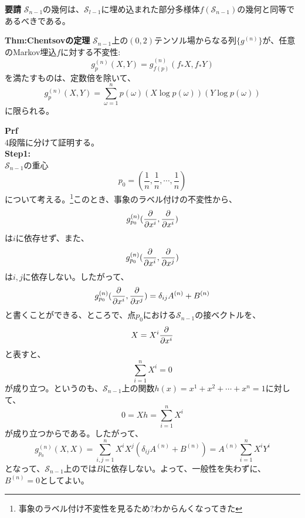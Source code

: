 \documentclass[a4paper,11pt]{jsarticle}
\numberwithin{equation}{section}
\begin{document}

\begin{itembox}[l]{\textbf{要請}}
    $\mathcal{S}_{n-1}$の幾何は、$\mathcal{S}_{l-1}$に埋め込まれた部分多様体$f(\mathcal{S}_{n-1})$の幾何と同等であるべきである。
\end{itembox}

\begin{itembox}[l]{\textbf{Thm:Chentsovの定理}}
    $\mathcal{S}_{n-1}$上の$(0,2)$テンソル場からなる列$\{g^{(n)}\}$が、任意のMarkov埋込$f$に対する不変性:
    \begin{equation}
        g^{(n)}_p(X,Y) = g^{(n)}_{f(p)}(f_*X,f_*Y)
    \end{equation}
    を満たすものは、定数倍を除いて、
    \begin{equation}
        g^{(n)}_p(X,Y) = \sum_{\omega = 1}^{n} p(\omega) (X\log p(\omega))(Y\log p(\omega))
    \end{equation}
    に限られる。
\end{itembox}
\textbf{Prf}\\
4段階に分けて証明する。\\
\textbf{Step1:}\\
$\mathcal{S}_{n-1}$の重心
\begin{equation}
    p_0 = \left( \frac{1}{n},\frac{1}{n},\cdots,\frac{1}{n} \right)
\end{equation}
について考える。\footnote{事象のラベル付け不変性を見るため?わからんくなってきた}このとき、事象のラベル付けの不変性から、
\begin{equation}
    g^{(n)}_{p_0}(\pdv{x^i},\pdv{x^i}) 
\end{equation}
は$i$に依存せず、また、
\begin{equation}
    g^{(n)}_{p_0}(\pdv{x^i},\pdv{x^j})
\end{equation}
は$i,j$に依存しない。したがって、
\begin{equation}
    g^{(n)}_{p_0}(\pdv{x^i},\pdv{x^j}) = \delta_{ij}A^{(n)} + B^{(n)}
\end{equation}
と書くことができる、ところで、点$p_0$における$\mathcal{S}_{n-1}$の接ベクトルを、
\begin{equation}
    X = X^i \pdv{x^i}
\end{equation}
と表すと、
\begin{equation}
    \sum_{i=1}^{n} X^i = 0
\end{equation}
が成り立つ。というのも、$\mathcal{S}_{n-1}$上の関数$h(x) = x^1 + x^2 + \cdots + x^n = 1$に対して、
\begin{equation}
    0 = Xh = \sum_{i=1}^{n} X^i
\end{equation}
が成り立つからである。したがって、
\begin{equation}
    g^{(n)}_{p_0}(X,X) = \sum_{i,j=1}^{n} X^i X^j (\delta_{ij}A^{(n)} + B^{(n)}) = A^{(n)} \sum_{i=1}^{n} X^i Y^i
\end{equation}
となって、$\mathcal{S}_{n-1}$上のでは$B$に依存しない。よって、一般性を失わずに、$B^{(n)} = 0$としてよい。\\
\end{document}
